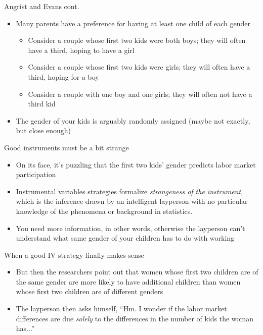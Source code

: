 \documentclass{beamer}
\begin{document}
\begin{frame}{Angrist and Evans cont.}

\begin{itemize}

		\item Many parents have a preference for having at least one child of each gender
			\begin{itemize}	
			\item Consider a couple whose first two kids were both boys; they will often have a third, hoping to have a girl
			\item Consider a couple whose first two kids were girls; they will often have a third, hoping for a boy
			\item Consider a couple with one boy and one girls; they will often not have a third kid
			\end{itemize}
		\item The gender of your kids is arguably randomly assigned (maybe not exactly, but close enough)
		\end{itemize}

\end{frame}



\begin{frame}{Good instruments must be a bit strange}

\begin{itemize}
		\item On its face, it's puzzling that the first two kids' gender predicts labor market participation
		\item Instrumental variables strategies formalize \emph{strangeness of the instrument}, which is the inference drawn by an intelligent layperson with no particular knowledge of the phenomena or background in statistics.
		\item You need more information, in other words, otherwise the layperson can't understand what same gender of your children has to do with working
\end{itemize}

\end{frame}

\begin{frame}{When a good IV strategy finally makes sense}

\begin{itemize}
		\item But then the researchers point out that women whose first two children are of the same gender are more likely to have additional children than women whose first two children are of different genders
		\item The layperson then asks himself, ``Hm. I wonder if the labor market differences are due \emph{solely} to the differences in the number of kids the woman has...''

\end{itemize}

\end{frame}
\end{document}
